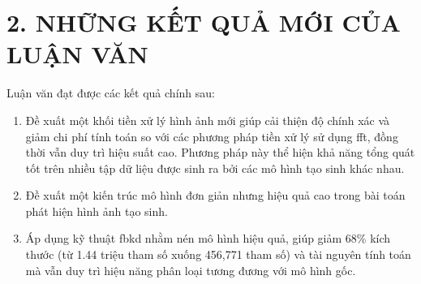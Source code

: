 \section*{2. NHỮNG KẾT QUẢ MỚI CỦA LUẬN VĂN}
Luận văn đạt được các kết quả chính sau:

\begin{enumerate}
	\item Đề xuất một khối tiền xử lý hình ảnh mới giúp cải thiện độ chính xác và giảm chi phí tính toán so với các phương pháp tiền xử lý sử dụng \gls{fft}, đồng thời vẫn duy trì hiệu suất cao. Phương pháp này thể hiện khả năng tổng quát tốt trên nhiều tập dữ liệu được sinh ra bởi các mô hình tạo sinh khác nhau.


	\item Đề xuất một kiến trúc mô hình đơn giản nhưng hiệu quả cao trong bài toán phát hiện hình ảnh tạo sinh.
	
	\item Áp dụng kỹ thuật \gls{fbkd} nhằm nén mô hình hiệu quả, giúp giảm 68\% kích thước (từ 1.44 triệu tham số xuống 456,771 tham số) và tài nguyên tính toán mà vẫn duy trì hiệu năng phân loại tương đương với mô hình gốc.
	
\end{enumerate}


